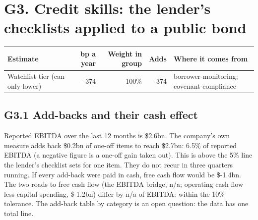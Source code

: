\documentclass[11pt,a4paper]{article}
\begin{document}
\section*{G3. Credit skills: the lender's checklists applied to a public bond}
\par\noindent{}
\begin{center}\footnotesize\setlength{\tabcolsep}{3.5pt}\begin{tabular}{@{}p{6.2cm}rrrp{4.2cm}@{}}\toprule
Estimate & bp a year & Weight in group & Adds & Where it comes from \\\midrule
Watchlist tier (can only lower) & -374 & 100\% & -374 & borrower-monitoring; covenant-compliance \\
\bottomrule\end{tabular}\end{center}
\subsection*{G3.1 Add-backs and their cash effect}
Reported EBITDA over the last 12 months is \$2.6bn. The company's own measure adds back \$0.2bn of one-off items to reach \$2.7bn: 6.5\% of reported EBITDA (a negative figure is a one-off gain taken out). This is above the 5\% line the lender's checklist sets for one item. They do not recur in three quarters running. If every add-back were paid in cash, free cash flow would be \$-1.4bn. The two roads to free cash flow (the EBITDA bridge, n/a; operating cash flow less capital spending, \$-1.2bn) differ by n/a of EBITDA: within the 10\% tolerance. The add-back table by category is an open question: the data has one total line.
\end{document}
